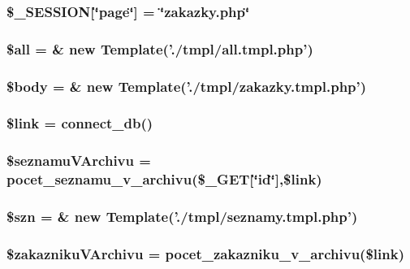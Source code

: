 \subsubsection{\setlength{\rightskip}{0pt plus 5cm}\$\_\-SESSION[\char`\"{}page\char`\"{}] = \char`\"{}zakazky.php\char`\"{}}\label{zakazky_8php_49aef95dde3b88cdc978b12cbbb95b26}


\subsubsection{\setlength{\rightskip}{0pt plus 5cm}\$all = \& new {\bf Template}('./tmpl/all.tmpl.php')}\label{zakazky_8php_3c74ea9d2348c9aba28d36e692bef2d2}


\subsubsection{\setlength{\rightskip}{0pt plus 5cm}\$body = \& new {\bf Template}('./tmpl/zakazky.tmpl.php')}\label{zakazky_8php_26b9f9373f7bb79dfcf8a86dff086b45}


\subsubsection{\setlength{\rightskip}{0pt plus 5cm}\$link = connect\_\-db()}\label{zakazky_8php_5d346e31b75d916e3bac9cb193bfc97f}


\subsubsection{\setlength{\rightskip}{0pt plus 5cm}\$seznamuVArchivu = pocet\_\-seznamu\_\-v\_\-archivu(\$\_\-GET[\char`\"{}id\char`\"{}],\$link)}\label{zakazky_8php_eac34dd03a06eb0f69c11bfdab0463f6}


\subsubsection{\setlength{\rightskip}{0pt plus 5cm}\$szn = \& new {\bf Template}('./tmpl/seznamy.tmpl.php')}\label{zakazky_8php_7557c2588a7a8dca804d8f9a3e717927}


\subsubsection{\setlength{\rightskip}{0pt plus 5cm}\$zakaznikuVArchivu = pocet\_\-zakazniku\_\-v\_\-archivu(\$link)}\label{zakazky_8php_180ca2e2404da6fcb0813c875fff3d46}


